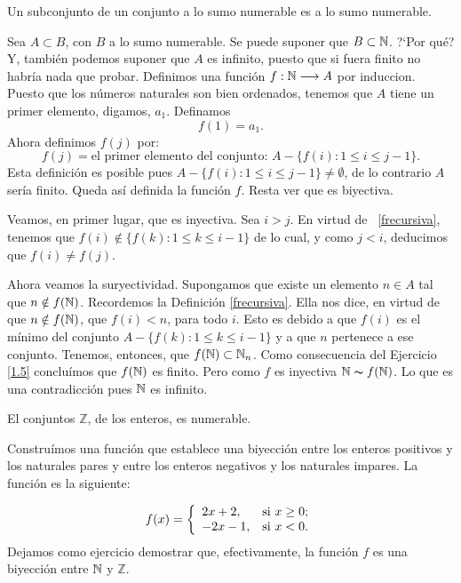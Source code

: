 \begin{proposicion}\label{subconjunto} Un subconjunto de un conjunto a lo sumo numerable es a
lo sumo numerable.
\end{proposicion}
\begin{demo} Sea $A\subset B$, con $B$ a lo sumo numerable. Se puede suponer
que $B\subset \mathbb{N}$. ?`Por qué? Y, también podemos suponer que
$A$ es infinito, puesto que si fuera finito no habría nada
que probar. Definimos una función $f:\mathbb{N}\longrightarrow A$ por
induccion. Puesto que los números naturales son bien ordenados,
tenemos que $A$ tiene un primer elemento, digamos, $a_1$.
Definamos
\[f(1)=a_1.\]
Ahora definimos $f(j)$ por:
\begin{equation}\label{frecursiva}
f(j)=\text{el primer elemento del conjunto: }A-\{f(i):1\leq i\leq
j-1\}. \end{equation} Esta definición es posible pues
$A-\{f(i):1\leq i\leq j-1\}\neq\emptyset$, de lo contrario $A$
sería finito. Queda así definida la función $f$. Resta
ver que es biyectiva.

Veamos, en primer lugar, que es inyectiva. Sea $i>j$. En virtud de
~\eqref{frecursiva}, tenemos que $f(i)\notin\{f(k):1\leq k\leq
i-1\}$ de lo cual, y como $j<i$, deducimos que $f(i)\neq f(j)$.

Ahora veamos la suryectividad. Supongamos que existe un elemento
$n\in A$ tal que $n\notin f(\mathbb{N})$. Recordemos la Definición
\eqref{frecursiva}. Ella nos dice, en virtud de que $n\notin
f(\mathbb{N})$, que $f(i)<n$, para todo $i$. Esto es debido a que $f(i)$
es el mínimo del conjunto $ A-\{f(k):1\leq k\leq i-1\}$ y a
que $n$ pertenece a ese conjunto. Tenemos, entonces, que
$f(\mathbb{N})\subset\mathbb{N}_n$. Como consecuencia del Ejercicio \vref{1.5}
concluímos que $f(\mathbb{N})$ es finito. Pero como $f$ es inyectiva
$\mathbb{N}\thicksim f(\mathbb{N})$. Lo que es una contradicción pues $\mathbb{N}$ es
infinito.
\end{demo}

\begin{proposicion}\label{zesnum}
El conjuntos $\mathbb{Z}$, de los enteros,  es numerable.
\end{proposicion}
\begin{demo} Construímos una función que establece
una biyección entre los enteros positivos y los naturales pares
y entre los enteros negativos y los naturales impares. La
función es la siguiente:

\[f(x)=\left\{
\begin{array}{ll}
    2x+2, & \hbox{si $x\geq 0$;} \\
    -2x-1, & \hbox{si $x<0$.} \\
\end{array}
\right.\] Dejamos como ejercicio demostrar que, efectivamente, la
función $f$ es una biyección entre $\mathbb{N}$ y $\mathbb{Z}$.
\end{demo}

